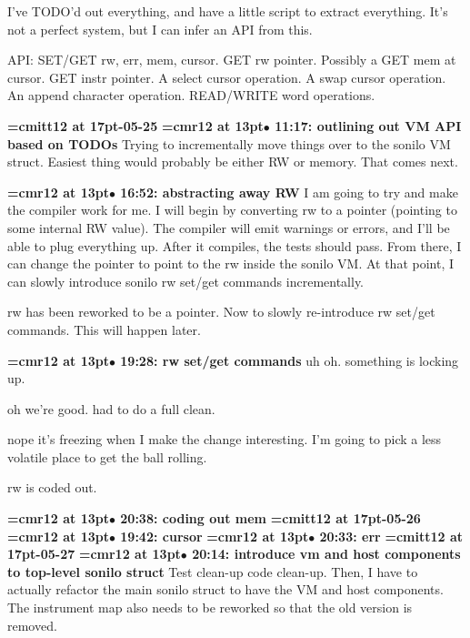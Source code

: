 I've TODO'd out everything, and have a little script to extract everything. It's not a perfect system, but I can infer an API from this.
\par

API: SET/GET rw, err, mem, cursor. GET rw pointer. Possibly a GET mem at cursor. GET instr pointer. A select cursor operation. A swap cursor operation. An append character operation. READ/WRITE word operations.
\par

{\medskip\noindent\bf\font\titlefont=cmitt12 at 17pt-05-25}\medskip
{\smallskip\noindent\bf\font\titlefont=cmr12 at 13pt\titlefont $\bullet$ 11:17: outlining out VM API based on TODOs}\smallskip
Trying to incrementally move things over to the sonilo VM struct. Easiest thing would probably be either RW or memory. That comes next.
\par

{\smallskip\noindent\bf\font\titlefont=cmr12 at 13pt\titlefont $\bullet$ 16:52: abstracting away RW}\smallskip
I am going to try and make the compiler work for me. I will begin by converting rw to a pointer (pointing to some internal RW value). The compiler will emit warnings or errors, and I'll be able to plug everything up. After it compiles, the tests should pass. From there, I can change the pointer to point to the rw inside the sonilo VM. At that point, I can slowly introduce sonilo rw set/get commands incrementally.
\par

rw has been reworked to be a pointer. Now to slowly re-introduce rw set/get commands. This will happen later.
\par

{\smallskip\noindent\bf\font\titlefont=cmr12 at 13pt\titlefont $\bullet$ 19:28: rw set/get commands}\smallskip
uh oh. something is locking up.
\par

oh we're good. had to do a full clean.
\par

nope it's freezing when I make the change interesting. I'm going to pick a less volatile place to get the ball rolling.
\par

rw is coded out.
\par

{\smallskip\noindent\bf\font\titlefont=cmr12 at 13pt\titlefont $\bullet$ 20:38: coding out mem}\smallskip
{\medskip\noindent\bf\font\titlefont=cmitt12 at 17pt-05-26}\medskip
{\smallskip\noindent\bf\font\titlefont=cmr12 at 13pt\titlefont $\bullet$ 19:42: cursor}\smallskip
{\smallskip\noindent\bf\font\titlefont=cmr12 at 13pt\titlefont $\bullet$ 20:33: err}\smallskip
{\medskip\noindent\bf\font\titlefont=cmitt12 at 17pt-05-27}\medskip
{\smallskip\noindent\bf\font\titlefont=cmr12 at 13pt\titlefont $\bullet$ 20:14: introduce vm and host components to top-level sonilo struct}\smallskip
Test clean-up code clean-up. Then, I have to actually refactor the main sonilo struct to have the VM and host components. The instrument map also needs to be reworked so that the old version is removed.
\par

